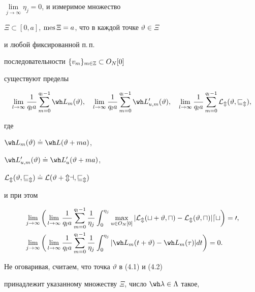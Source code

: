 $\lim\limits_{j\to\infty}\eta_j=0$, и измеримое множество


$\Xi\subset[0,a]$, $\operatorname{mes}\Xi=a$, что в каждой точке $\vartheta\in\Xi$


и любой фиксированной п.\,п.


последовательности $\{v_m\}_{m\in\Bbb Z}\subset O_N[0]$


существуют пределы


\begin{equation}


\lim_{l\to\infty}\frac{1}{q_la}\sum_{m=0}^{q_l-1}\wh L_m(\vartheta),


\quad


\lim_{l\to\infty}\frac{1}{q_la}\sum_{m=0}^{q_l-1}\wh


L'_{u,m}(\vartheta),\quad


\lim_{l\to\infty}\frac{1}{q_la}\sum_{m=0}^{q_l-1}\cal L_m(\vartheta,v_m),


\end{equation}


где


$\wh L_m(\vartheta)\doteq\wh L(\vartheta+ma)$,


$\wh L'_{u,m}(\vartheta)\doteq\wh L'_{u}(\vartheta+ma)$,


$\cal L_m(\vartheta,v_m)\doteq {\cal L}(\vartheta+ma,v_m)$


и при этом


\begin{align}


&\lim_{j\to\infty}\bigg(\lim_{l\to\infty}\frac{1}{q_la}


\sum_{m=0}^{q_l-1}\frac{1}{\eta_j}\int_0^{\eta_j}


\max_{u\in O_N[0]}|\cal L_m(t+\vartheta,u)-


\cal L_m(\vartheta,u)|dt\bigg)=0,\\


&\lim_{j\to\infty}\bigg(\lim_{l\to\infty}\frac{1}{q_la}


\sum_{m=0}^{q_l-1}\frac{1}{\eta_j}\int_0^{\eta_j}|\wh L_m(t+\vartheta)-\wh


L_m(\tau)|dt\bigg)=0.


\end{align}





Не оговаривая, считаем, что точка $\vartheta$ в (4.1) и (4.2)


принадлежит указанному множеству $\Xi$, число $\wh \lambda\in\Lambda$ такое,


